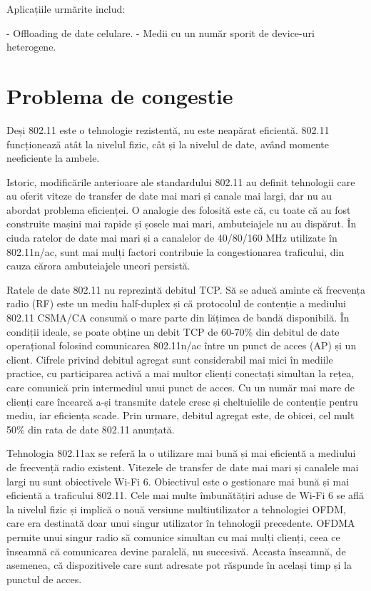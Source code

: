 \documentclass[a4paper,12pt]{report}
\begin{document}
Aplicațiile urmărite includ:

- Offloading de date celulare.
- Medii cu un număr sporit de device-uri heterogene.


\section{Problema de congestie}

Deși 802.11 este o tehnologie rezistentă, nu este neapărat eficientă.
802.11 funcționează atât la nivelul fizic, cât și la nivelul de date, având momente neeficiente la ambele.

Istoric, modificările anterioare ale standardului 802.11 au definit tehnologii care au oferit viteze de transfer de date mai mari și canale mai largi, dar nu au abordat problema eficienței.
O analogie des folosită este că, cu toate că au fost construite mașini mai rapide și șosele mai mari, ambuteiajele nu au dispărut.
În ciuda ratelor de date mai mari și a canalelor de 40/80/160 MHz utilizate în 802.11n/ac, sunt mai mulți factori contribuie la congestionarea traficului, din cauza cărora ambuteiajele uneori persistă.

Ratele de date 802.11 nu reprezintă debitul TCP.
Să se aducă aminte că frecvența radio (RF) este un mediu half-duplex și că protocolul de contenție a mediului 802.11 CSMA/CA consumă o mare parte din lățimea de bandă disponibilă.
În condiții ideale, se poate obține un debit TCP de 60-70\% din debitul de date operațional folosind comunicarea 802.11n/ac între un punct de acces (AP) și un client.
Cifrele privind debitul agregat sunt considerabil mai mici în mediile practice, cu participarea activă a mai multor clienți conectați simultan la rețea, care comunică prin intermediul unui punct de acces.
Cu un număr mai mare de clienți care încearcă a-și transmite datele cresc și cheltuielile de contenție pentru mediu, iar eficiența scade.
Prin urmare, debitul agregat este, de obicei, cel mult 50\% din rata de date 802.11 anunțată.

Tehnologia 802.11ax se referă la o utilizare mai bună și mai eficientă a mediului de frecvență radio existent.
Vitezele de transfer de date mai mari și canalele mai largi nu sunt obiectivele Wi-Fi 6.
Obiectivul este o gestionare mai bună și mai eficientă a traficului 802.11.
Cele mai multe îmbunătățiri aduse de Wi-Fi 6 se află la nivelul fizic și implică o nouă versiune multiutilizator a tehnologiei OFDM, care era destinată doar unui singur utilizator în tehnologii precedente.
OFDMA permite unui singur radio să comunice simultan cu mai mulți clienți, ceea ce înseamnă că comunicarea devine paralelă, nu succesivă.
Aceasta înseamnă, de asemenea, că dispozitivele care sunt adresate pot răspunde în același timp și la punctul de acces.
\end{document}
